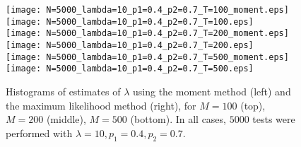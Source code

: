 \documentclass[a4paper,10pt,twoside]{article}
\begin{document}
\begin{figure}
	\centering
	\texttt{[image: N=5000\_lambda=10\_p1=0.4\_p2=0.7\_T=100\_moment.eps]}
	\texttt{[image: N=5000\_lambda=10\_p1=0.4\_p2=0.7\_T=100.eps]}\\
	\texttt{[image: N=5000\_lambda=10\_p1=0.4\_p2=0.7\_T=200\_moment.eps]}
	\texttt{[image: N=5000\_lambda=10\_p1=0.4\_p2=0.7\_T=200.eps]}\\
	\texttt{[image: N=5000\_lambda=10\_p1=0.4\_p2=0.7\_T=500\_moment.eps]}
	\texttt{[image: N=5000\_lambda=10\_p1=0.4\_p2=0.7\_T=500.eps]}	
	\caption{Histograms of estimates of $\lambda$ using the moment method (left) and the maximum likelihood method (right),
		for $M=100$ (top), $M=200$ (middle), $M=500$ (bottom).
		In all
		cases, $5000$ tests were performed with $\lambda=10,p_1=0.4,p_2=0.7$.}
	\label{fig2}
\end{figure}
\end{document}
